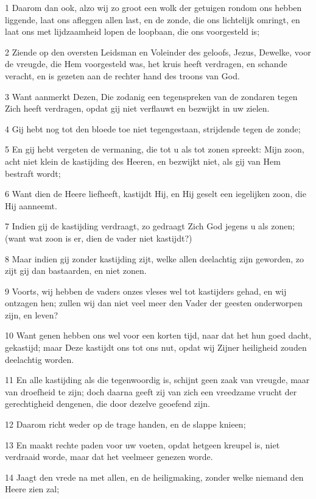 \par 1 Daarom dan ook, alzo wij zo groot een wolk der getuigen rondom ons hebben liggende, laat ons afleggen allen last, en de zonde, die ons lichtelijk omringt, en laat ons met lijdzaamheid lopen de loopbaan, die ons voorgesteld is;
\par 2 Ziende op den oversten Leidsman en Voleinder des geloofs, Jezus, Dewelke, voor de vreugde, die Hem voorgesteld was, het kruis heeft verdragen, en schande veracht, en is gezeten aan de rechter hand des troons van God.
\par 3 Want aanmerkt Dezen, Die zodanig een tegenspreken van de zondaren tegen Zich heeft verdragen, opdat gij niet verflauwt en bezwijkt in uw zielen.
\par 4 Gij hebt nog tot den bloede toe niet tegengestaan, strijdende tegen de zonde;
\par 5 En gij hebt vergeten de vermaning, die tot u als tot zonen spreekt: Mijn zoon, acht niet klein de kastijding des Heeren, en bezwijkt niet, als gij van Hem bestraft wordt;
\par 6 Want dien de Heere liefheeft, kastijdt Hij, en Hij geselt een iegelijken zoon, die Hij aanneemt.
\par 7 Indien gij de kastijding verdraagt, zo gedraagt Zich God jegens u als zonen; (want wat zoon is er, dien de vader niet kastijdt?)
\par 8 Maar indien gij zonder kastijding zijt, welke allen deelachtig zijn geworden, zo zijt gij dan bastaarden, en niet zonen.
\par 9 Voorts, wij hebben de vaders onzes vleses wel tot kastijders gehad, en wij ontzagen hen; zullen wij dan niet veel meer den Vader der geesten onderworpen zijn, en leven?
\par 10 Want genen hebben ons wel voor een korten tijd, naar dat het hun goed dacht, gekastijd; maar Deze kastijdt ons tot ons nut, opdat wij Zijner heiligheid zouden deelachtig worden.
\par 11 En alle kastijding als die tegenwoordig is, schijnt geen zaak van vreugde, maar van droefheid te zijn; doch daarna geeft zij van zich een vreedzame vrucht der gerechtigheid dengenen, die door dezelve geoefend zijn.
\par 12 Daarom richt weder op de trage handen, en de slappe knieen;
\par 13 En maakt rechte paden voor uw voeten, opdat hetgeen kreupel is, niet verdraaid worde, maar dat het veelmeer genezen worde.
\par 14 Jaagt den vrede na met allen, en de heiligmaking, zonder welke niemand den Heere zien zal;
